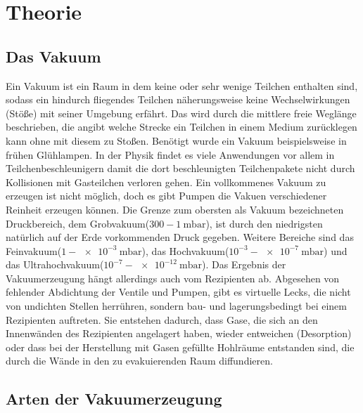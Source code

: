
\section{Theorie}
\label{sec:Theorie}

\subsection{Das Vakuum}

Ein Vakuum ist ein Raum in dem keine oder sehr wenige Teilchen enthalten sind, sodass ein hindurch fliegendes Teilchen näherungsweise keine Wechselwirkungen (Stöße) mit seiner Umgebung erfährt. Das wird durch die mittlere freie Weglänge beschrieben, die angibt welche Strecke ein Teilchen in einem Medium zurücklegen kann ohne mit diesem zu Stoßen.\newline
Benötigt wurde ein Vakuum beispielsweise in frühen Glühlampen. In der Physik findet es viele Anwendungen vor allem in Teilchenbeschleunigern damit die dort beschleunigten Teilchenpakete nicht durch Kollisionen mit Gasteilchen verloren gehen.\newline
Ein vollkommenes Vakuum zu erzeugen ist nicht möglich, doch es gibt Pumpen die Vakuen verschiedener Reinheit erzeugen können. Die Grenze zum obersten als Vakuum bezeichneten Druckbereich, dem Grobvakuum($300 - \SI{1}{\milli\bar}$), ist durch den niedrigsten natürlich auf der Erde vorkommenden Druck gegeben. Weitere Bereiche sind das Feinvakuum($1 - \SI{e-3}{\milli\bar}$), das Hochvakuum($10^{-3} - \SI{e-7}{\milli\bar}$) und das Ultrahochvakuum($10^{-7} - \SI{e-12}{\milli\bar}$).\newline
Das Ergebnis der Vakuumerzeugung hängt allerdings auch vom Rezipienten ab. Abgesehen von fehlender Abdichtung der Ventile und Pumpen, gibt es virtuelle Lecks, die nicht von undichten Stellen herrühren, sondern bau- und lagerungsbedingt bei einem Rezipienten auftreten. Sie entstehen dadurch, dass Gase, die sich an den Innenwänden des Rezipienten angelagert haben, wieder entweichen (Desorption) oder dass bei der Herstellung mit Gasen gefüllte Hohlräume entstanden sind, die durch die Wände in den zu evakuierenden Raum diffundieren.

\subsection{Arten der Vakuumerzeugung}

